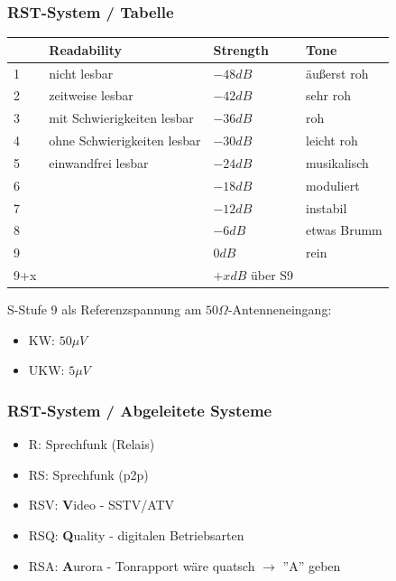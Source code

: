 \begin{frame}
    \frametitle{RST-System / Tabelle}

    \begin{center}
    \footnotesize
    \begin{tabular}{|l|l|l|l|}\hline
          & \textbf{R}eadability        & \textbf{S}trength & \textbf{T}one \\ \hline \hline
        1 & nicht lesbar                & $-48 dB$          & äußerst roh   \\ \hline
        2 & zeitweise lesbar            & $-42 dB$          & sehr roh      \\ \hline
        3 & mit Schwierigkeiten lesbar  & $-36 dB$          & roh           \\ \hline
        4 & ohne Schwierigkeiten lesbar & $-30 dB$          & leicht roh    \\ \hline
        5 & einwandfrei lesbar          & $-24 dB$          & musikalisch   \\ \hline
        6 &                             & $-18 dB$          & moduliert     \\ \hline
        7 &                             & $-12 dB$          & instabil      \\ \hline
        8 &                             & $-6 dB$           & etwas Brumm   \\ \hline
        9 &                             & $0dB$             & rein          \\ \hline
        9+x &                           & $+x dB$ über S9   &               \\ \hline
    \end{tabular}
    \end{center}

    S-Stufe 9 als Referenzspannung am $50 \Omega$-Antenneneingang:
    \begin{itemize}
        \item KW: $50\mu V$
        \item UKW: $5\mu V$
    \end{itemize}

\end{frame}

\begin{frame}
    \frametitle{RST-System / Abgeleitete Systeme}

    \begin{itemize}
        \item R: Sprechfunk (Relais)
        \item RS: Sprechfunk (p2p)
        \item RSV: \textbf{V}ideo - SSTV/ATV
        \item RSQ: \textbf{Q}uality - digitalen Betriebsarten
        \item RSA: \textbf{A}urora - Tonrapport wäre quatsch $\rightarrow$ ''A'' geben
    \end{itemize}

\end{frame}

